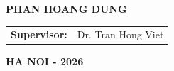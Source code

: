 \begin{titlepage}
    \thispagestyle{empty}
    \thesiscoverframe\par
    \centering
    \thesisinstitution
    \vspace{2.5cm}
    {\Large\textbf{PHAN HOANG DUNG}\par}
    \vspace{2.1cm}
    \thesistitle
    \vspace{1.1cm}
    \thesisdegree
    \vspace{2.5cm}
    \begin{tabular}{ll}
        \textbf{Supervisor:} & Dr. Tran Hong Viet \\
    \end{tabular}\par
    \vfill
    \centering
    {\large\textbf{HA NOI - 2026}\par}
    \vspace{0.5cm}
\end{titlepage}
\clearpage
